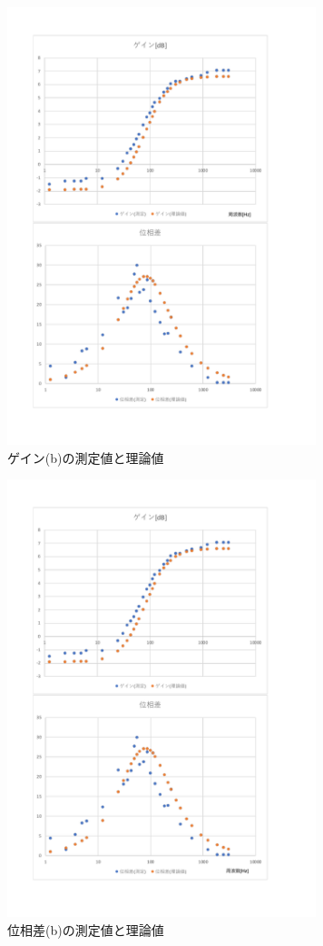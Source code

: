 \documentclass[uplatex, 11pt,a4j, titlepage]{jsarticle}
\begin{document}
\begin{figure}[h]
    \centering
    \includegraphics[width=9cm]{ideal_plot.pdf}
    \caption{ゲイン(b)の測定値と理論値}
    \label{idealplot}
\end{figure}

\begin{figure}[h]
    \centering
    \includegraphics[width=9cm]{ideal_plot2.pdf}
    \caption{位相差(b)の測定値と理論値}
    \label{idealplot2}
\end{figure}
\end{document}
